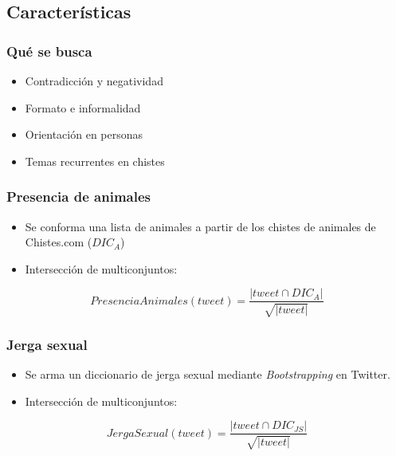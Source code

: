 \subsection{Características}

\begin{frame}
    \frametitle{Qué se busca}

    \begin{itemize}
        \item Contradicción y negatividad
        \item Formato e informalidad
        \item Orientación en personas
        \item Temas recurrentes en chistes
    \end{itemize}
\end{frame}

\begin{frame}
    \frametitle{Presencia de animales}

    \begin{itemize}
        \item Se conforma una lista de animales a partir de los chistes de animales de Chistes.com ($DIC_A$)
        \item Intersección de multiconjuntos:
    \end{itemize}

    \begin{center}
        \[
            PresenciaAnimales(tweet) = \frac{|tweet \cap DIC_A|}{\sqrt{|tweet|}}
        \]
    \end{center}
\end{frame}

\begin{frame}
    \frametitle{Jerga sexual}

    \begin{itemize}
        \item Se arma un diccionario de jerga sexual mediante \emph{Bootstrapping} en Twitter.
        \item Intersección de multiconjuntos:
    \end{itemize}

    \begin{center}
        \[
            JergaSexual(tweet) = \frac{|tweet \cap DIC_{JS}|}{\sqrt{|tweet|}}
        \]
    \end{center}
\end{frame}

